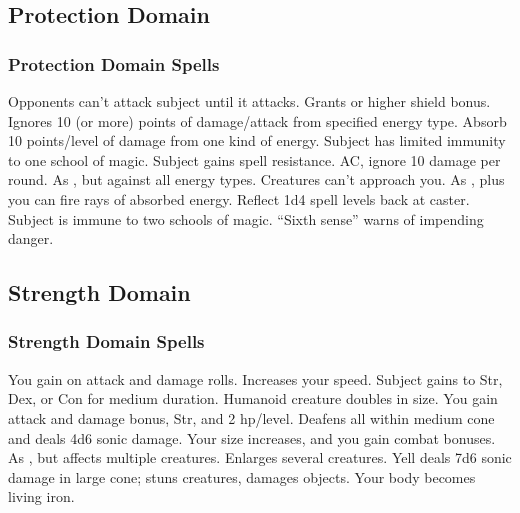 \subsection{Protection Domain}
\subsubsection{Protection Domain Spells}
\begin{spelllist}
   Opponents can't attack subject until it attacks.
   Grants  or higher shield bonus.
   Ignores 10 (or more) points of damage/attack from specified energy type.
  \spellhead[2]{}
   Absorb 10 points/level of damage from one kind of energy.
   Subject has limited immunity to one school of magic. 
   Subject gains spell resistance.
    AC, ignore 10 damage per round.
  \spellhead[5]{}
  \spellhead[5]{}
   As , but against all energy types.
   Creatures can't approach you.
   As , plus you can fire rays of absorbed energy.
   Reflect 1d4 spell levels back at caster.
  \spellhead[8]{}
   Subject is immune to two schools of magic.
   ``Sixth sense'' warns of impending danger.
  \spellhead[9]{}
\end{spelllist}

\subsection{Strength Domain}

\subsubsection{Strength Domain Spells}
\begin{spelllist}
   You gain  on attack and damage rolls.
   Increases your speed.
   Subject gains  to Str, Dex, or Con for medium duration.
  \spellhead[2]{}
   Humanoid creature doubles in size.
  \spellhead[3]{}
   You gain attack and damage bonus,  Str, and 2 hp/level.
   Deafens all within medium cone and deals 4d6 sonic damage.
   Your size increases, and you gain combat bonuses.
  \spellhead[5]{}
  \spellhead[6]{}
   As , but affects multiple creatures.
   Enlarges several creatures.
   Yell deals 7d6 sonic damage in large cone; stuns creatures, damages objects.
   Your body becomes living iron.
  \spellhead[8]{}
  \spellhead[9]{}
  \spellhead[9]{} 
\end{spelllist}

